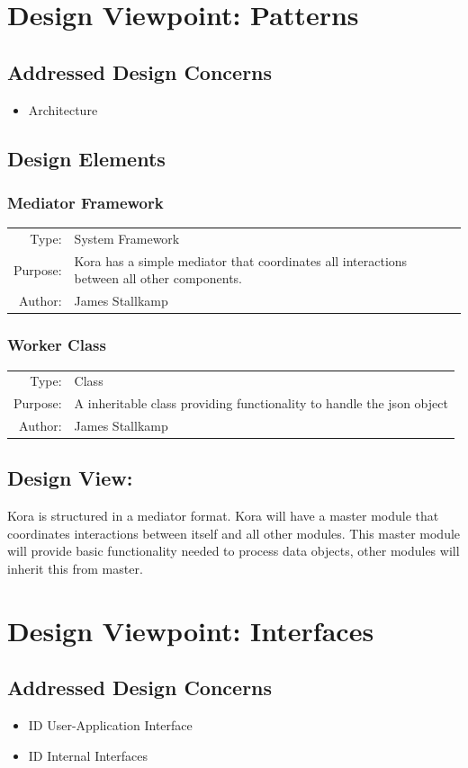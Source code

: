 \documentclass[onecolumn, draftclsnofoot,10pt, compsoc]{IEEEtran}
\def \botname{Kora\xspace}
\newcommand{\designConcernRef}[2][]{
    #2 #1
}
\newcommand{\designElementDef}[4]{
    \subsubsection{#1}
    \begin{tabular}[t]{r p{6in}}
        Type: & #2 \\
        Purpose: & #3 \\
        Author: & #4 \\
    \end{tabular}
}
\begin{document}
		

\section{Design Viewpoint: Patterns}
    \subsection{Addressed Design Concerns}
        \begin{itemize}
            \item \designConcernRef[]{Architecture}
        \end{itemize}

    \subsection{Design Elements}
		\designElementDef{Mediator Framework}
						 {System Framework}
						 {\botname has a simple mediator that coordinates all interactions between all other components.}
						 {James Stallkamp}
		\designElementDef{Worker Class}
						 {Class}
						 {A inheritable class providing functionality to handle the json object}
						 {James Stallkamp}				 
    \subsection{Design View: }
		\botname is structured in a mediator format. 
		\botname will have a master module that coordinates interactions between itself and all other modules.
		This master module will provide basic functionality needed to process data objects, other modules will inherit this from master. 


\section{Design Viewpoint: Interfaces}
    \subsection{Addressed Design Concerns}
        \begin{itemize}
            \item \designConcernRef[User-Application Interface]{ID}
            \item \designConcernRef[Internal Interfaces]{ID}
        \end{itemize}
\end{document}
